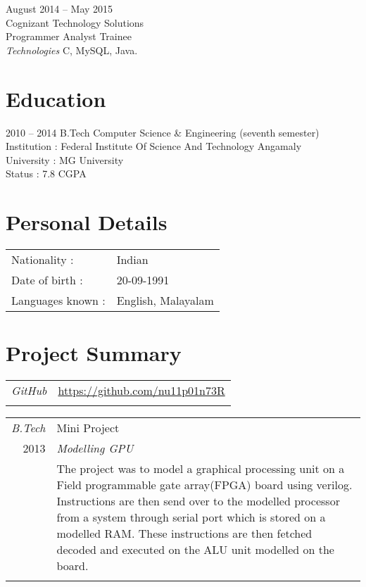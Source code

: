 \documentclass[a4paper]{article}
\begin{document}
\begin{CV}
\item[August 2014 -- May 2015]
    ~\\
    Cognizant Technology Solutions\\
    Programmer Analyst Trainee\\
    \emph{Technologies} C, MySQL, Java.
\end{CV}


\section{Education}
\begin{CV}
\item[2010 -- 2014] B.Tech Computer Science \& Engineering (seventh semester) \\
    Institution : Federal Institute Of Science And Technology Angamaly \\
    University : MG University \\
    Status : 7.8 CGPA 
\end{CV}

\section{Personal Details}
\begin{flushleft}
\begin{tabular}{ll}
Nationality : & Indian\\
Date of birth : & 20-09-1991 \\
Languages known : & English, Malayalam
\end{tabular}
\end{flushleft}


\section{Project Summary}
\begin{tabular}{r|p{15cm}}
\emph{GitHub}  & \normalsize{\url{https://github.com/nu11p01n73R}}\\

\multicolumn{2}{c}{}\ %
\end{tabular}

\begin{tabular}{r|p{15cm}}
\emph{B.Tech} & Mini Project \\
\textsc{2013} & \emph{Modelling GPU} \\
& \normalsize{The project was to model a graphical processing unit on a Field programmable gate array(FPGA) board using verilog. Instructions are then send over to the modelled processor from a system through serial port which is stored on a modelled RAM. These instructions are then fetched decoded and executed on the ALU unit modelled on the board.
}\\

\multicolumn{2}{c}{}\ %
\end{tabular}
\end{document}
